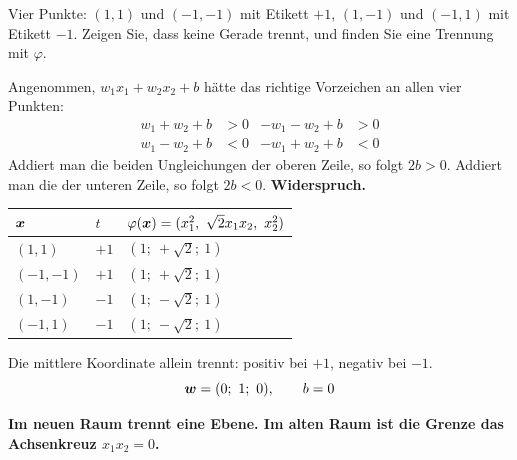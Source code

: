 \begin{aufgabe}
Vier Punkte: $(1,1)$ und $(-1,-1)$ mit Etikett $+1$, $(1,-1)$ und $(-1,1)$ mit Etikett $-1$. Zeigen Sie, dass keine Gerade trennt, und finden Sie eine Trennung mit $\varphi$.

\loesung
{}
Angenommen, $w_1x_1 + w_2x_2 + b$ hätte das richtige Vorzeichen an allen vier Punkten:
\begin{align*}
w_1 + w_2 + b &> 0 & -w_1 - w_2 + b &> 0\\
w_1 - w_2 + b &< 0 & -w_1 + w_2 + b &< 0
\end{align*}
Addiert man die beiden Ungleichungen der oberen Zeile, so folgt $2b > 0$. Addiert man die der unteren Zeile, so folgt $2b < 0$. \textbf{Widerspruch.}

\begin{center}
{\small
\renewcommand{\arraystretch}{1.48}
\begin{tabular}{@{}P{2.0cm}P{1.0cm}P{3.6cm}@{}}
\toprule
$\boldsymbol{x}$ & $t$ & $\varphi(\vek x) = (x_1^{2},\ \sqrt2x_1x_2,\ x_2^{2})$\\
\midrule
$(1,1)$ & $+1$ & $(1;\ +\sqrt2;\ 1)$\\
$(-1,-1)$ & $+1$ & $(1;\ +\sqrt2;\ 1)$\\
$(1,-1)$ & $-1$ & $(1;\ -\sqrt2;\ 1)$\\
$(-1,1)$ & $-1$ & $(1;\ -\sqrt2;\ 1)$\\
\bottomrule
\end{tabular}}
\end{center}

Die mittlere Koordinate allein trennt: positiv bei $+1$, negativ bei $-1$.
\[ \boldsymbol{w} = (0;\ 1;\ 0), \qquad b = 0 \]

\begin{center}
\begin{minipage}{0.9\textwidth}
\textbf{Im neuen Raum trennt eine Ebene. Im alten Raum ist die Grenze das Achsenkreuz $x_1x_2 = 0$.}
\end{minipage}
\end{center}

\begin{center}
\begin{minipage}{0.88\textwidth}
\end{minipage}
\end{center}
\end{aufgabe}


